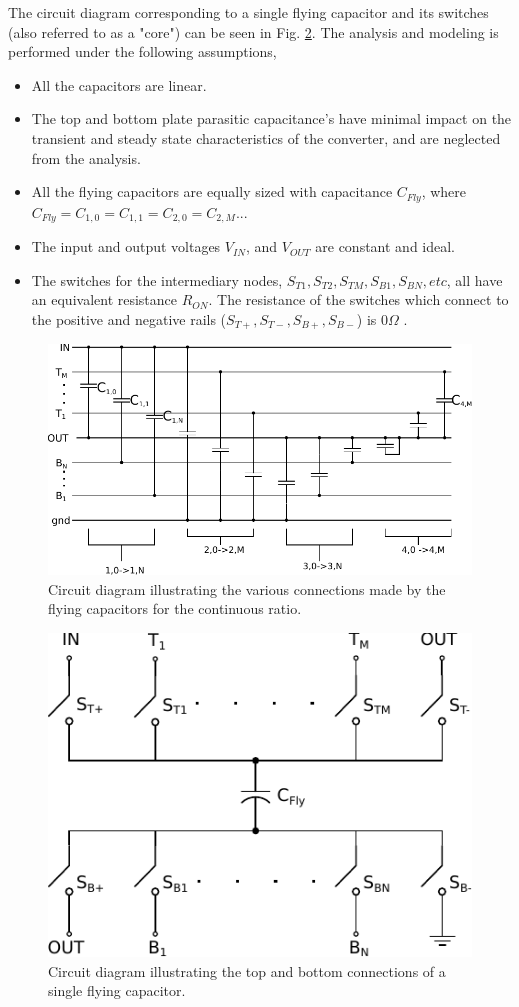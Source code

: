 \documentclass[conference]{IEEEtran}
\begin{document}
	The circuit diagram corresponding to a single flying capacitor and its switches (also referred to as a "core") can be seen in Fig. \ref{fig:coreCon}. The analysis and modeling is performed under the following assumptions,
	\begin{itemize}
		\item All the capacitors are linear.
		\item The top and bottom plate parasitic capacitance's have minimal impact on the transient and steady state characteristics of the converter, and are neglected from the analysis.
		\item All the flying capacitors are equally sized with capacitance $C_{Fly}$, where $C_{Fly} = C_{1,0} = C_{1,1} = C_{2,0} = C_{2,M} ...$
		\item The input and output voltages $V_{IN}$, and $V_{OUT}$ are constant and ideal.
		\item The switches for the intermediary nodes, $S_{T1}, S_{T2}, S_{TM}, S_{B1}, S_{BN}, etc$, all have an equivalent resistance $R_{ON}$. The resistance of the switches which connect to the positive and negative rails ($S_{T+}, S_{T-}, S_{B+}, S_{B-}$) is 0$\Omega$ .
	\end{itemize}
	\begin{figure}
		\centering
		\includegraphics[width=\linewidth]{Figures/contRatioCircuit2.pdf}
		\caption{Circuit diagram illustrating the various connections made by the flying capacitors for the continuous ratio.}
		\label{fig:contTop}
	\end{figure}
	\begin{figure}
		\centering
		\includegraphics[width=0.6\linewidth]{Figures/contRatioCore.pdf}
		\caption{Circuit diagram illustrating the top and bottom connections of a single flying capacitor.}
		\label{fig:coreCon}
	\end{figure}
\end{document}
